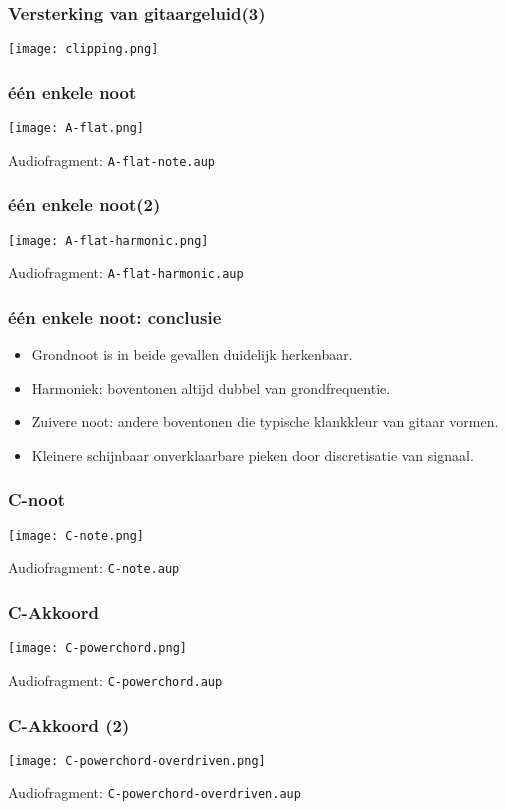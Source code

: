 \documentclass[compress, darktitle, framenumber]{beamer}
\begin{document}
\begin{frame}
\frametitle{Versterking van gitaargeluid(3)}
\texttt{[image: clipping.png]}
\end{frame}

\begin{frame}
\frametitle{\'e\'en enkele noot}
\texttt{[image: A-flat.png]}
\begin{block}{Audiofragment:}
\texttt{A-flat-note.aup} 
\end{block}
\end{frame}

\begin{frame}
\frametitle{\'e\'en enkele noot(2)}
\texttt{[image: A-flat-harmonic.png]}
\begin{block}{Audiofragment:}
\texttt{A-flat-harmonic.aup} 
\end{block}
\end{frame}

\begin{frame}
\frametitle{\'e\'en enkele noot: conclusie}
\begin{itemize}
\item Grondnoot is in beide gevallen duidelijk herkenbaar.
\item Harmoniek: boventonen altijd dubbel van grondfrequentie. 
\item Zuivere noot: andere boventonen die typische klankkleur van gitaar vormen. 
\item Kleinere schijnbaar onverklaarbare pieken door discretisatie van signaal. 
\end{itemize}
\end{frame}


\begin{frame}
\frametitle{C-noot}
\texttt{[image: C-note.png]}
\begin{block}{Audiofragment:}
\texttt{C-note.aup} 
\end{block}
\end{frame}


\begin{frame}
\frametitle{C-Akkoord}
\texttt{[image: C-powerchord.png]}
\begin{block}{Audiofragment:}
\texttt{C-powerchord.aup}
\end{block}
\end{frame}

\begin{frame}
\frametitle{C-Akkoord (2)}
\texttt{[image: C-powerchord-overdriven.png]}
\begin{block}{Audiofragment:}
\texttt{C-powerchord-overdriven.aup}
\end{block}
\end{frame}
\end{document}
